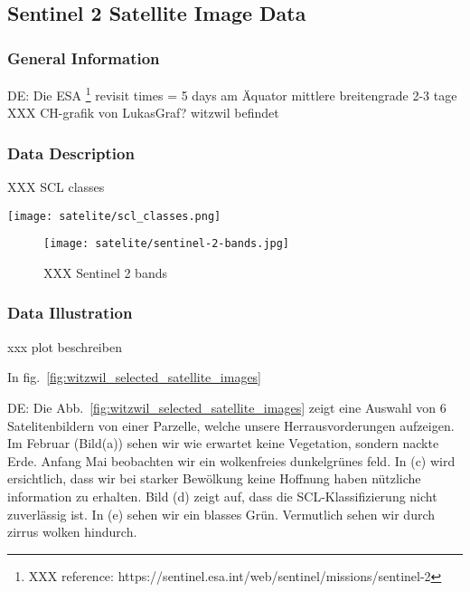 	\subsection{Sentinel 2 Satellite Image Data}{
		\subsubsection*{General Information}{
			DE:
			Die ESA \footnote{XXX reference: https://sentinel.esa.int/web/sentinel/missions/sentinel-2}
			revisit times = 5 days am Äquator
			mittlere breitengrade 2-3 tage
			XXX CH-grafik von LukasGraf?
			witzwil befindet

		}

		\subsubsection*{Data Description}{
			\begin{table}[h]
				\caption{XXX SCL classes}
				\label{tab:satelite/scl_classes}
				\center
				\texttt{[image: satelite/scl\_classes.png]}
			\end{table}
			
			\begin{figure}[h]
				\label{fig:satelite/sentinel-2-bands}
				\center
				\texttt{[image: satelite/sentinel-2-bands.jpg]}
				\caption{XXX Sentinel 2 bands}
			\end{figure}
		}

		\subsubsection*{Data Illustration}{
			xxx plot beschreiben
			
			In fig.~\ref{fig:witzwil_selected_satellite_images} 

			DE:  
			Die Abb.~\ref{fig:witzwil_selected_satellite_images} zeigt eine Auswahl von 6 Satelitenbildern von einer Parzelle, welche unsere Herrausvorderungen aufzeigen. Im Februar (Bild(a)) sehen wir wie erwartet keine Vegetation, sondern nackte Erde. Anfang Mai beobachten wir ein wolkenfreies dunkelgrünes feld. In (c) wird ersichtlich, dass wir bei starker Bewölkung keine Hoffnung haben nützliche information zu erhalten. Bild (d) zeigt auf, dass die SCL-Klassifizierung nicht zuverlässig ist. In (e) sehen wir ein blasses Grün. Vermutlich sehen wir durch zirrus wolken hindurch.   
			
		}
	}






